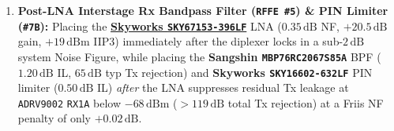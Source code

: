\documentclass[10pt,a4paper]{article}
\renewcommand{\_}{\origunderscore\penalty0\hskip0pt\relax}
\numberwithin{equation}{section}
\numberwithin{table}{section}
\numberwithin{figure}{section}
\begin{document}
\begin{enumerate}
  \item \textbf{Post-LNA Interstage Rx Bandpass Filter (\texttt{RFFE \#5}) \& PIN Limiter (\texttt{\#7B}):} Placing the \href{https://www.skyworksinc.com/-/media/E8035E0D44534E2F81C778F84AF03796.pdf}{\textbf{Skyworks \texttt{SKY67153-396LF}}} LNA ($0.35\,\text{dB}$ NF, $+20.5\,\text{dB}$ gain, $+19\,\text{dBm}$ IIP3) immediately after the diplexer locks in a sub-$2\,\text{dB}$ system Noise Figure, while placing the \textbf{Sangshin \texttt{MBP76RC2067S85A}} BPF ($1.20\,\text{dB}$ IL, $65\,\text{dB}$ typ Tx rejection) and \textbf{Skyworks \texttt{SKY16602-632LF}} PIN limiter ($0.50\,\text{dB}$ IL) \emph{after} the LNA suppresses residual Tx leakage at \texttt{ADRV9002} \texttt{RX1A} below $-68\,\text{dBm}$ ($>119\,\text{dB}$ total Tx rejection) at a Friis NF penalty of only $+0.02\,\text{dB}$.
\end{enumerate}
\end{document}
